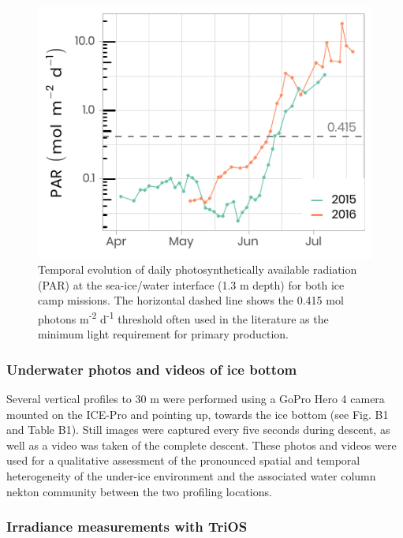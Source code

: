 \documentclass[essd, manuscript]{copernicus}
\begin{document}
\begin{figure}[H]
	\centering
	\includegraphics[scale = 1]{../../../../graphs/fig05.pdf}
	\caption{Temporal evolution of daily photosynthetically available radiation (PAR) at the sea-ice/water interface (1.3 m depth) for both ice camp missions. The horizontal dashed line shows the 0.415 mol photons m\textsuperscript{-2} d\textsuperscript{-1} threshold often used in the literature as the minimum light requirement for primary production.}
\end{figure}

\subsubsection{Underwater photos and videos of ice bottom}

Several vertical profiles to 30 m were performed using a GoPro Hero 4 camera mounted on the ICE-Pro and pointing up, towards the ice bottom (see Fig. B1 and Table B1). Still images were captured every five seconds during descent, as well as a video was taken of the complete descent. These photos and videos were used for a qualitative assessment of the pronounced spatial and temporal heterogeneity of the under-ice environment and the associated water column nekton community between the two profiling locations.

\subsubsection{Irradiance measurements with TriOS}
\end{document}
